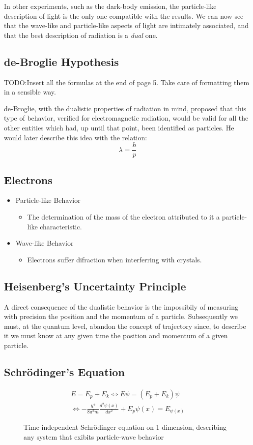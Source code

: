 \documentclass{article}[10pt]
\begin{document}
In other experiments, such as the dark-body emission, the particle-like
description of light is the only one compatible with the results. We can now see
that the wave-like and particle-like aspects of light are intimately associated,
and that the best description of radiation is a \emph{dual} one.
\subsection{de-Broglie Hypothesis}
TODO:\@ Insert all the formulas at the end of page 5. Take care of formatting
them in a sensible way.

de-Broglie, with the dualistic properties of radiation in mind,
proposed that this type of behavior, verified for electromagnetic radiation,
would be valid for all the other entities which had, up until that point, been
identified as particles. He would later describe this idea with the
relation:
$$\lambda = \frac{h}{p}$$
\subsection{Electrons}
\begin{itemize}
    \item Particle-like Behavior
          \begin{itemize}
              \item The determination of the mass of the electron attributed to
                    it a particle-like characteristic.
          \end{itemize}
    \item Wave-like Behavior
          \begin{itemize}
              \item Electrons suffer difraction when interferring with crystals.
          \end{itemize}
\end{itemize}
\subsection{Heisenberg's Uncertainty Principle}
A direct consequence of the dualistic behavior is the impossibily of measuring
with precision the position and the momentum of a particle. Subsequently we
must, at the quantum level, abandon the concept of trajectory since, to describe
it we must know at any given time the position and momentum of a given particle.
\subsection{Schrödinger's Equation}
\begin{figure}[H]
    \centering
    \begin{align*}
        E = E_p + E_k \iff E\psi = (E_p + E_k)\psi \\
        \iff -\frac{h^2}{8\pi^2 m}\frac{d^2\psi(x)}{dx^2} + E_p\psi(x) = E_{\psi(x)}
    \end{align*}
    \caption*{Time independent Schrödinger equation on 1 dimension, describing any system that exibits particle-wave behavior}
\end{figure}
\end{document}
